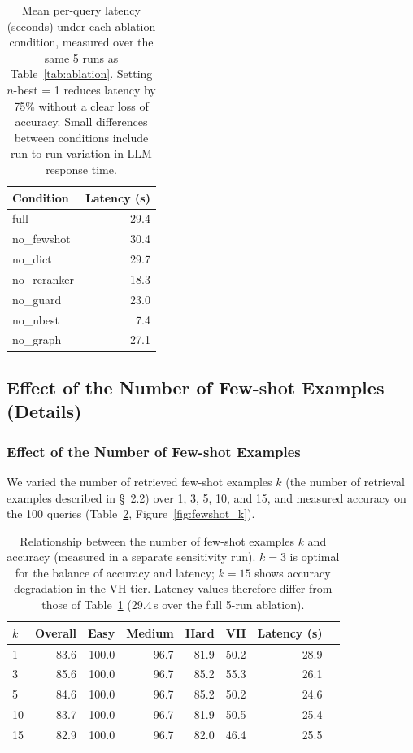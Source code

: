 \begin{table}[t]
\centering
\caption{Mean per-query latency (seconds) under each ablation condition, measured over the same 5 runs as Table~\ref{tab:ablation}. Setting $n$-best = 1 reduces latency by 75\% without a clear loss of accuracy. Small differences between conditions include run-to-run variation in LLM response time.}
\label{tab:latency}
\small
\begin{tabular}{@{}lr@{}}
\toprule
Condition & Latency (s) \\
\midrule
full & 29.4 \\
no\_fewshot & 30.4 \\
no\_dict & 29.7 \\
no\_reranker & 18.3 \\
no\_guard & 23.0 \\
no\_nbest & 7.4 \\
no\_graph & 27.1 \\
\bottomrule
\end{tabular}
\end{table}


\subsection{Effect of the Number of Few-shot Examples (Details)}

\subsubsection{Effect of the Number of Few-shot Examples}

We varied the number of retrieved few-shot examples $k$ (the number of retrieval examples described in \S~2.2) over 1, 3, 5, 10, and 15, and measured accuracy on the 100 queries (Table~\ref{tab:fewshot_k}, Figure~\ref{fig:fewshot_k}).

\begin{table}[t]
\centering
\caption{Relationship between the number of few-shot examples $k$ and accuracy (measured in a separate sensitivity run).
$k=3$ is optimal for the balance of accuracy and latency;
$k=15$ shows accuracy degradation in the VH tier.
Latency values therefore differ from
those of Table~\ref{tab:latency} (29.4\,s over the full 5-run ablation).}
\label{tab:fewshot_k}
\small
\begin{tabular}{@{}lrrrrrrr@{}}
\toprule
$k$ & Overall & Easy & Medium & Hard & VH & Latency (s) \\
\midrule
1  & 83.6 & 100.0 & 96.7 & 81.9 & 50.2 & 28.9 \\
3  & 85.6 & 100.0 & 96.7 & 85.2 & 55.3 & 26.1 \\
5  & 84.6 & 100.0 & 96.7 & 85.2 & 50.2 & 24.6 \\
10 & 83.7 & 100.0 & 96.7 & 81.9 & 50.5 & 25.4 \\
15 & 82.9 & 100.0 & 96.7 & 82.0 & 46.4 & 25.5 \\
\bottomrule
\end{tabular}
\end{table}

